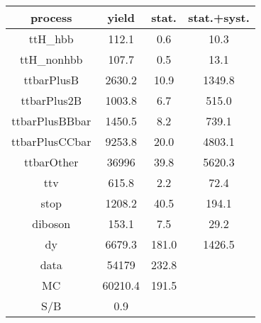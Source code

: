 \begin{tabular}{cccc}
\hline
    process     &  yield  &  stat.  &  stat.+syst.  \\
\hline
    ttH\_hbb     &  112.1  &   0.6   &     10.3      \\
   ttH\_nonhbb   &  107.7  &   0.5   &     13.1      \\
   ttbarPlusB   & 2630.2  &  10.9   &    1349.8     \\
  ttbarPlus2B   & 1003.8  &   6.7   &     515.0     \\
 ttbarPlusBBbar & 1450.5  &   8.2   &     739.1     \\
 ttbarPlusCCbar & 9253.8  &  20.0   &    4803.1     \\
   ttbarOther   &  36996  &  39.8   &    5620.3     \\
      ttv       &  615.8  &   2.2   &     72.4      \\
      stop      & 1208.2  &  40.5   &     194.1     \\
    diboson     &  153.1  &   7.5   &     29.2      \\
       dy       & 6679.3  &  181.0  &    1426.5     \\
      data      &  54179  &  232.8  &               \\
       MC       & 60210.4 &  191.5  &               \\
      S/B       &   0.9   &         &               \\
\hline
\end{tabular}